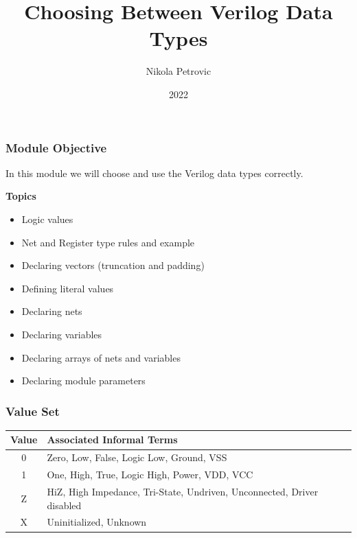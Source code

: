 \documentclass[t, notes, xcolor=table]{beamer}
\title{Choosing Between Verilog Data Types}
\author{Nikola Petrovic}
\institute{University of Belgrade, School of Electrical Engineering}
\date{2022}
\begin{document}
\frame{\titlepage}

\begin{frame}
\frametitle{Module Objective}

In this module we will choose and use the Verilog data types correctly.
\newline

\textbf{Topics}

\begin{itemize}
\item Logic values
\item Net and Register type rules and example
\item Declaring vectors (truncation and padding)
\item Defining literal values
\item Declaring nets
\item Declaring variables
\item Declaring arrays of nets and variables
\item Declaring module parameters
\end{itemize}

\end{frame}

\begin{frame}
\frametitle{Value Set}
\footnotesize{

\begin{tabular}{ |c|l| } 
\hline
 \rowcolor{lightgray} 
 Value & Associated Informal Terms  \\ 
 \hline
 0 & Zero, Low, False, Logic Low, Ground, VSS  \\ 
 \hline
 1 & One, High, True, Logic High, Power, VDD, VCC  \\ 
 \hline
 Z & HiZ, High Impedance, Tri-State, Undriven, Unconnected, Driver disabled   \\ 
 \hline
 X & Uninitialized, Unknown  \\ 
 \hline
\end{tabular}
}
\end{frame}

\end{document}
